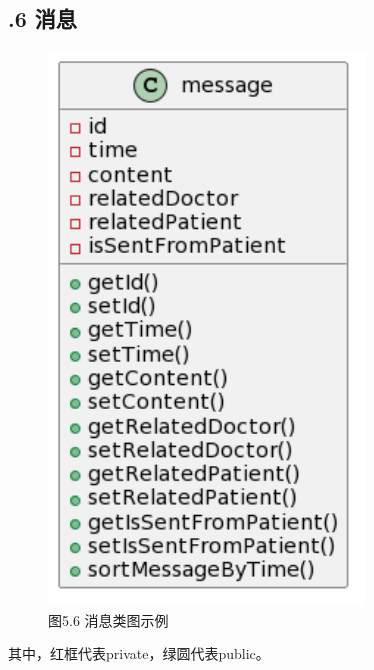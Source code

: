 \documentclass[24pt,a4paper]{article}%
\begin{document}
\subsection*{.6 消息}
\begin{figure}[H]
    \centering
    \includegraphics[width=0.75\textwidth]{images/message.png}
    \caption*{图5.6 消息类图示例}
\end{figure}
其中，红框代表private，绿圆代表public。
\end{document}
